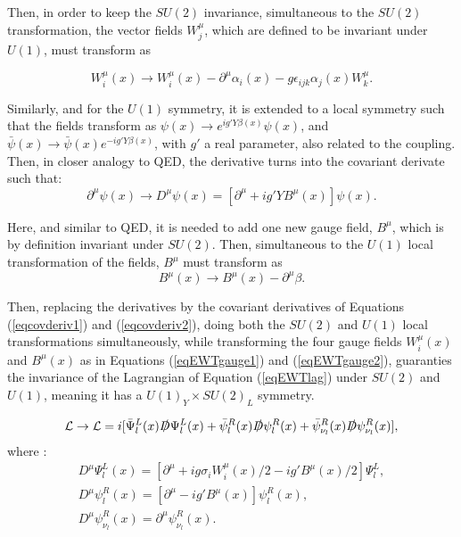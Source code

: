Then, in order to keep the $SU(2)$ invariance, simultaneous to the $SU(2)$ transformation, the vector fields $W_j^{\mu}$, which are defined to be invariant under $U(1)$, must transform as \cite{Mandl}

\begin{equation}
\label{eqEWTgauge1}
    W_i^{\mu}(x) \rightarrow W_i^{\mu}(x) - \partial^{\mu}\alpha_i(x) - g\epsilon_{ijk}\alpha_j(x)W_k^{\mu}.
\end{equation}

Similarly, and for the $U(1)$ symmetry, it is extended to a local symmetry such that the fields transform as $\psi(x) \rightarrow e^{ig'Y\beta(x)}\psi(x)$, and $\bar{\psi}(x) \rightarrow \bar{\psi}(x)e^{-ig'Y\beta(x)}$, with $g'$ a real parameter, also related to the coupling. Then, in closer analogy to QED, the derivative turns into the covariant derivate such that:
\begin{equation}
\label{eqcovderiv2}
    \partial^{\mu}\psi(x) \rightarrow D^{\mu}\psi(x) = [\partial^{\mu} + ig'YB^{\mu}(x)]\psi(x).
\end{equation}

Here, and similar to QED, it is needed to add one new gauge field, $B^{\mu}$, which is by definition invariant under $SU(2)$. Then, simultaneous to the $U(1)$ local transformation of the fields, $B^{\mu}$ must transform as
\begin{equation}
\label{eqEWTgauge2}
    B^{\mu}(x) \rightarrow B^{\mu}(x) - \partial^{\mu}\beta.
\end{equation}

Then, replacing the derivatives by the covariant derivatives of Equations (\ref{eqcovderiv1}) and (\ref{eqcovderiv2}), doing both the $SU(2)$ and $U(1)$ local transformations simultaneously, while transforming the four gauge fields $W_i^{\mu}(x)$ and $B^{\mu}(x)$ as in Equations (\ref{eqEWTgauge1}) and (\ref{eqEWTgauge2}), guaranties the invariance of the Lagrangian of Equation (\ref{eqEWTlag}) under $SU(2)$ and $U(1)$, meaning it has a $U(1)_Y\times SU(2)_L$ symmetry.

\begin{equation}
\label{eqEWTlag}
    \mathcal{L} \rightarrow \mathcal{L} = i[\Bar{\Psi}^L_l(x)\slashed{D}\Psi^L_l(x) + \bar{\psi}^R_l(x)\slashed{D}\psi^R_l(x) + \bar{\psi}^R_{\nu_l}(x)\slashed{D}\psi^R_{\nu_l}(x)],
\end{equation}
where \cite{Mandl}:
\begin{gather*}
    D^{\mu}\Psi^L_l(x) = [\partial^{\mu} + ig\sigma_iW_i^{\mu}(x)/2 - ig'B^{\mu}(x)/2]\Psi^L_l, \\
    D^{\mu}\psi^R_l(x) = [\partial^{\mu} - ig'B^{\mu}(x)]\psi^R_l(x), \\
    D^{\mu}\psi^R_{\nu_l}(x) = \partial^{\mu}\psi^R_{\nu_l}(x).
\end{gather*}

